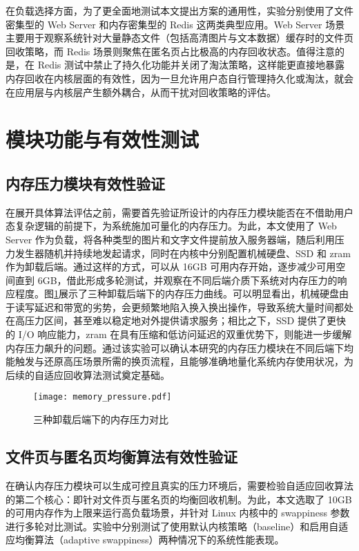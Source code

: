 在负载选择方面，为了更全面地测试本文提出方案的通用性，实验分别使用了文件密集型的 Web Server 和内存密集型的 Redis 这两类典型应用。Web Server 场景主要用于观察系统针对大量静态文件（包括高清图片与文本数据）缓存时的文件页回收策略，而 Redis 场景则聚焦在匿名页占比极高的内存回收状态。值得注意的是，在 Redis 测试中禁止了持久化功能并关闭了淘汰策略，这样能更直接地暴露内存回收在内核层面的有效性，因为一旦允许用户态自行管理持久化或淘汰，就会在应用层与内核层产生额外耦合，从而干扰对回收策略的评估。

\section{模块功能与有效性测试}

\subsection{内存压力模块有效性验证}

在展开具体算法评估之前，需要首先验证所设计的内存压力模块能否在不借助用户态复杂逻辑的前提下，为系统施加可量化的内存压力。为此，本文使用了 Web Server 作为负载，将各种类型的图片和文字文件提前放入服务器端，随后利用压力发生器随机并持续地发起请求，同时在内核中分别配置机械硬盘、SSD 和 zram 作为卸载后端。通过这样的方式，可以从 16GB 可用内存开始，逐步减少可用空间直到 6GB，借此形成多轮测试，并观察在不同后端介质下系统对内存压力的响应程度。图\ref{fig:memory_pressure}展示了三种卸载后端下的内存压力曲线。可以明显看出，机械硬盘由于读写延迟和带宽的劣势，会更频繁地陷入换入换出操作，导致系统大量时间都处在高压力区间，甚至难以稳定地对外提供请求服务；相比之下，SSD 提供了更快的 I/O 响应能力，zram 在具有压缩和低访问延迟的双重优势下，则能进一步缓解内存压力飙升的问题。通过该实验可以确认本研究的内存压力模块在不同后端下均能触发与还原高压场景所需的换页流程，且能够准确地量化系统内存使用状况，为后续的自适应回收算法测试奠定基础。

\begin{figure}[htbp]
    \centering
    \texttt{[image: memory\_pressure.pdf]}
    \caption{三种卸载后端下的内存压力对比}
    \label{fig:memory_pressure}
\end{figure}


\subsection{文件页与匿名页均衡算法有效性验证}
\label{sec:file_page_anonymous_page_balance_algorithm_validation}

在确认内存压力模块可以生成可控且真实的压力环境后，需要检验自适应回收算法的第二个核心：即针对文件页与匿名页的均衡回收机制。为此，本文选取了 10GB 的可用内存作为上限来运行高负载场景，并针对 Linux 内核中的  swappiness  参数进行多轮对比测试。实验中分别测试了使用默认内核策略（baseline）和启用自适应均衡算法（adaptive  swappiness）两种情况下的系统性能表现。

